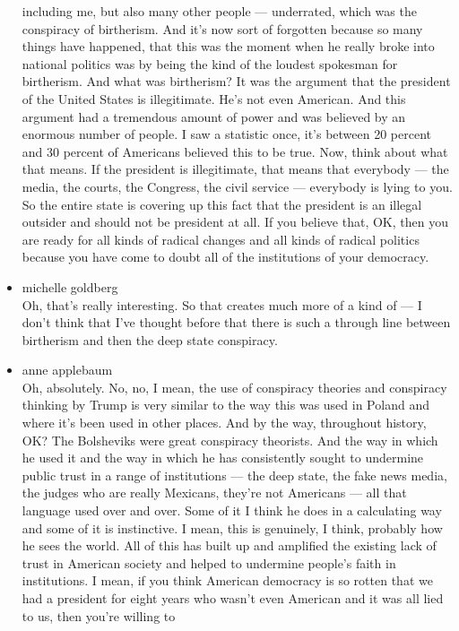 \begin{itemize}
  including me, but also many other people --- underrated, which was the
  conspiracy of birtherism. And it's now sort of forgotten because so
  many things have happened, that this was the moment when he really
  broke into national politics was by being the kind of the loudest
  spokesman for birtherism. And what was birtherism? It was the argument
  that the president of the United States is illegitimate. He's not even
  American. And this argument had a tremendous amount of power and was
  believed by an enormous number of people. I saw a statistic once, it's
  between 20 percent and 30 percent of Americans believed this to be
  true. Now, think about what that means. If the president is
  illegitimate, that means that everybody --- the media, the courts, the
  Congress, the civil service --- everybody is lying to you. So the
  entire state is covering up this fact that the president is an illegal
  outsider and should not be president at all. If you believe that, OK,
  then you are ready for all kinds of radical changes and all kinds of
  radical politics because you have come to doubt all of the
  institutions of your democracy.
\item
  michelle goldberg\\
  Oh, that's really interesting. So that creates much more of a kind of
  --- I don't think that I've thought before that there is such a
  through line between birtherism and then the deep state conspiracy.
\item
  anne applebaum\\
  Oh, absolutely. No, no, I mean, the use of conspiracy theories and
  conspiracy thinking by Trump is very similar to the way this was used
  in Poland and where it's been used in other places. And by the way,
  throughout history, OK? The Bolsheviks were great conspiracy
  theorists. And the way in which he used it and the way in which he has
  consistently sought to undermine public trust in a range of
  institutions --- the deep state, the fake news media, the judges who
  are really Mexicans, they're not Americans --- all that language used
  over and over. Some of it I think he does in a calculating way and
  some of it is instinctive. I mean, this is genuinely, I think,
  probably how he sees the world. All of this has built up and amplified
  the existing lack of trust in American society and helped to undermine
  people's faith in institutions. I mean, if you think American
  democracy is so rotten that we had a president for eight years who
  wasn't even American and it was all lied to us, then you're willing to

\end{itemize}
